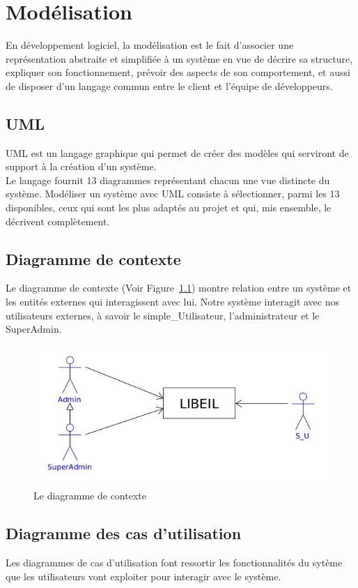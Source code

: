 \chapter{Mod\'elisation}


	En d\'eveloppement logiciel, la mod\'elisation est le fait d'associer une repr\'esentation abstraite et simplifi\'ee \`a un syst\`eme en vue de d\'ecrire sa structure, expliquer son fonctionnement, pr\'evoir des aspects de son comportement, et aussi de disposer d'un langage commun entre le client et l'\'equipe de d\'eveloppeurs.
	
	\section{UML}
		UML est un langage graphique qui permet de cr\'eer des mod\`eles qui serviront de support \`a la cr\'eation d'un syst\`eme. \\
		Le langage fournit 13 diagrammes repr\'esentant chacun une vue distincte du syst\`eme. Mod\'eliser un syst\`eme avec UML consiste \`a s\'electionner, parmi les 13 disponibles, ceux qui sont les plus adapt\'es au projet et qui, mis ensemble, le d\'ecrivent compl\`etement.\\
		
		
	\section{Diagramme de contexte}
		Le diagramme de contexte (Voir Figure~\ref{DiagrammeDeContexte}) montre relation entre un syst\`eme et les entit\'es externes qui interagissent avec lui. Notre syst\`eme interagit avec nos utilisateurs externes, \`a savoir le simple\_Utilisateur, l'administrateur et le SuperAdmin.
		
		\begin{figure}[!ht]
			\centering
			\includegraphics[width=0.5\linewidth]{Pictures/DiagrammeDeContexte.jpg}
			\caption{Le diagramme de contexte}
			\label{DiagrammeDeContexte}
		\end{figure}

	\section{Diagramme des cas d'utilisation}
		Les diagrammes de cas d'utilisation font ressortir les fonctionnalit\'es du syt\`eme que les utilisateurs vont exploiter pour interagir avec le syst\`eme.
		
